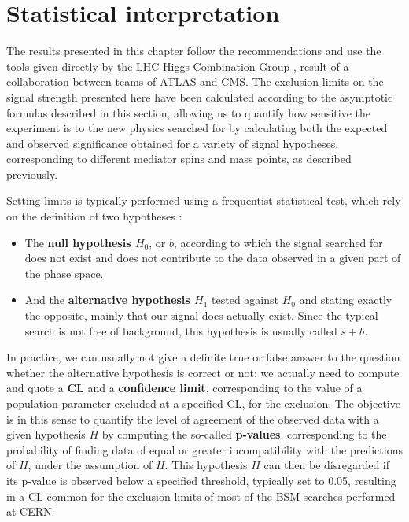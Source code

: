 \documentclass[a4paper, 10pt, openright]{report}
\begin{document}
\section{Statistical interpretation} \label{section:Statistics}

The results presented in this chapter follow the recommendations and use the tools given directly by the \ac{LHC} Higgs Combination Group \cite{combine}, result of a collaboration between teams of \ac{ATLAS} and \ac{CMS}. The exclusion limits on the signal strength presented here have been calculated according to the asymptotic formulas described in this section, allowing us to quantify how sensitive the experiment is to the new physics searched for by calculating both the expected and observed significance obtained for a variety of signal hypotheses, corresponding to different mediator spins and mass points, as described previously.

Setting limits is typically performed using a frequentist statistical test, which rely on the definition of two hypotheses \cite{stat1, stat2}: 
 
\begin{itemize} 
\item The \textbf{null hypothesis $H_0$}, or $b$, according to which the signal searched for does not exist and does not contribute to the data observed in a given part of the phase space.
\item And the \textbf{alternative hypothesis $H_1$} tested against $H_0$ and stating exactly the opposite, mainly that our signal does actually exist. Since the typical search
is not free of background, this hypothesis is usually called $s+b$.
\end{itemize}

In practice, we can usually not give a definite true or false answer to the question whether the alternative hypothesis is correct or not: we actually need to compute and quote a \textbf{\ac{CL}} and a \textbf{confidence limit}, corresponding to the value of a population parameter excluded at a specified \ac{CL}, for the exclusion. The objective is in this sense to quantify the level of agreement of the observed data with a given hypothesis $H$ by computing the so-called \textbf{p-values}, corresponding to the probability of finding data of equal or greater incompatibility with the predictions of $H$, under the assumption of $H$. This hypothesis $H$ can then be disregarded if its p-value is observed below a specified threshold, typically set to 0.05, resulting in a \ac{CL} common for the exclusion limits of most of the \ac{BSM} searches performed at \ac{CERN}.
\end{document}

